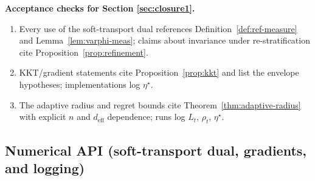 \begin{mdframed}
\textbf{Acceptance checks for Section \ref{sec:closure1}.}
\begin{enumerate}[leftmargin=*]
\item Every use of the soft-transport dual references Definition~\ref{def:ref-measure} and Lemma~\ref{lem:varphi-meas}; claims about invariance under re-stratification cite Proposition~\ref{prop:refinement}.
\item KKT/gradient statements cite Proposition~\ref{prop:kkt} and list the envelope hypotheses; implementations log $\eta^\star$.
\item The adaptive radius and regret bounds cite Theorem~\ref{thm:adaptive-radius} with explicit $n$ and $d_{\mathrm{eff}}$ dependence; runs log $\widehat L_t$, $\rho_t$, $\eta^\star$.
\end{enumerate}
\end{mdframed}

\subsection*{Numerical API (soft-transport dual, gradients, and logging)}

